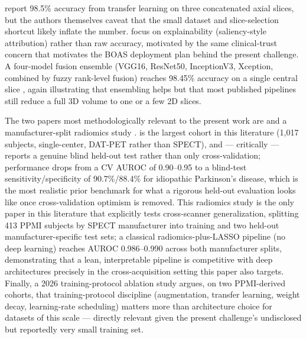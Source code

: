 \documentclass[11pt]{article}
\begin{document}
\citet{quan2019} report 98.5\% accuracy from transfer learning on three concatenated axial slices, but the authors themselves caveat that the small dataset and slice-selection shortcut likely inflate the number. \citet{nazari2021} focus on explainability (saliency-style attribution) rather than raw accuracy, motivated by the same clinical-trust concern that motivates the BOAS deployment plan behind the present challenge. A four-model fusion ensemble (VGG16, ResNet50, InceptionV3, Xception, combined by fuzzy rank-level fusion) reaches 98.45\% accuracy on a single central slice \citep{ensemblefusion2022}, again illustrating that ensembling helps but that most published pipelines still reduce a full 3D volume to one or a few 2D slices.

The two papers most methodologically relevant to the present work are \citet{zhao2022} and a manufacturer-split radiomics study \citep{radiomics2022}. \citet{zhao2022} is the largest cohort in this literature (1{,}017 subjects, single-center, DAT-PET rather than SPECT), and --- critically --- reports a genuine blind held-out test rather than only cross-validation; performance drops from a CV AUROC of 0.90--0.95 to a blind-test sensitivity/specificity of 90.7\%/88.4\% for idiopathic Parkinson's disease, which is the most realistic prior benchmark for what a rigorous held-out evaluation looks like once cross-validation optimism is removed. This radiomics study \citep{radiomics2022} is the only paper in this literature that explicitly tests cross-scanner generalization, splitting 413 PPMI subjects by SPECT manufacturer into training and two held-out manufacturer-specific test sets; a classical radiomics-plus-LASSO pipeline (no deep learning) reaches AUROC 0.986--0.990 across both manufacturer splits, demonstrating that a lean, interpretable pipeline is competitive with deep architectures precisely in the cross-acquisition setting this paper also targets. Finally, a 2026 training-protocol ablation study \citep{trainingprotocol2026} argues, on two PPMI-derived cohorts, that training-protocol discipline (augmentation, transfer learning, weight decay, learning-rate scheduling) matters more than architecture choice for datasets of this scale --- directly relevant given the present challenge's undisclosed but reportedly very small training set.
\end{document}
